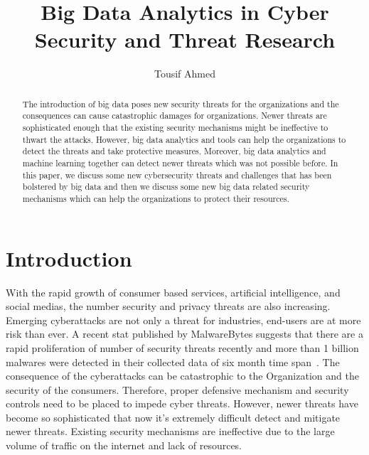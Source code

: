 \documentclass[sigconf]{acmart}
\begin{document}
\title{Big Data Analytics in Cyber Security and Threat Research}


\author{Tousif Ahmed}


\renewcommand{\shortauthors}{B. Trovato et al.}


\begin{abstract}
The introduction of big data poses new security threats for the organizations and the consequences can cause catastrophic damages for organizations. Newer threats are sophisticated enough that the existing security mechanisms might be ineffective to thwart the attacks. However, big data analytics and tools can help the organizations to detect the threats and take protective measures. Moreover, big data analytics and machine learning together can detect newer threats which was not possible before. In this paper, we discuss some new cybersecurity threats and challenges that has been bolstered by big data and then we discuss some new big data related security mechanisms which can help the organizations to protect their resources. 
\end{abstract}



\maketitle

\section{Introduction}

With the rapid growth of consumer based services, artificial intelligence, and social medias, the number security and privacy threats are also increasing. Emerging cyberattacks are not only a threat for industries, end-users are at more risk than ever. A recent stat published by MalwareBytes suggests that there are a rapid proliferation of number of security threats recently and more than 1 billion malwares were detected in their collected data of six month time span~\cite{malware}. The consequence of the cyberattacks can be catastrophic to the Organization and the security of the consumers. Therefore, proper defensive mechanism and security controls need to be placed to impede cyber threats. However, newer threats have become so sophisticated that now it's extremely difficult detect and mitigate newer threats. Existing security mechanisms are ineffective due to the large volume of traffic on the internet and lack of resources.  
\end{document}
